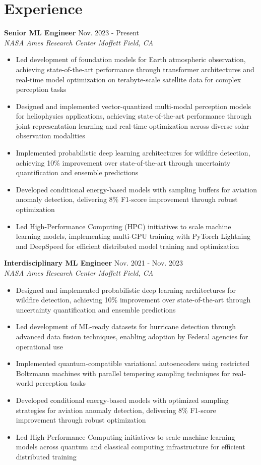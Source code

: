 \documentclass[11pt,a4paper]{article}
\newcommand{\entry}[4]{
    {\textbf{#1}} \hfill #2 \\
    {\textit{#3}} \hfill \textit{#4} \\
}
\begin{document}
\section*{Experience}
\entry{Senior ML Engineer}{Nov. 2023 - Present}{NASA Ames Research Center}{Moffett Field, CA}
\begin{itemize}[nosep,leftmargin=*]
\item Led development of foundation models for Earth atmospheric observation, achieving state-of-the-art performance through transformer architectures and real-time model optimization on terabyte-scale satellite data for complex perception tasks
\item Designed and implemented vector-quantized multi-modal perception models for heliophysics applications, achieving state-of-the-art performance through joint representation learning and real-time optimization across diverse solar observation modalities
\item Implemented probabilistic deep learning architectures for wildfire detection, achieving 10\% improvement over state-of-the-art through uncertainty quantification and ensemble predictions
\item Developed conditional energy-based models with sampling buffers for aviation anomaly detection, delivering 8\% F1-score improvement through robust optimization
\item Led High-Performance Computing (HPC) initiatives to scale machine learning models, implementing multi-GPU training with PyTorch Lightning and DeepSpeed for efficient distributed model training and optimization
\end{itemize}

\entry{Interdisciplinary ML Engineer}{Nov. 2021 - Nov. 2023}{NASA Ames Research Center}{Moffett Field, CA}
\begin{itemize}[nosep,leftmargin=*]
\item Designed and implemented probabilistic deep learning architectures for wildfire detection, achieving 10\% improvement over state-of-the-art through uncertainty quantification and ensemble predictions
\item Led development of ML-ready datasets for hurricane detection through advanced data fusion techniques, enabling adoption by Federal agencies for operational use
\item Implemented quantum-compatible variational autoencoders using restricted Boltzmann machines with parallel tempering sampling techniques for real-world perception tasks
\item Developed conditional energy-based models with optimized sampling strategies for aviation anomaly detection, delivering 8\% F1-score improvement through robust optimization
\item Led High-Performance Computing initiatives to scale machine learning models across quantum and classical computing infrastructure for efficient distributed training
\end{itemize}
\end{document}
